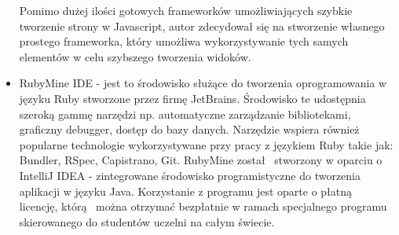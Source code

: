\begin{itemize}
 Pomimo dużej ilości gotowych frameworków umożliwiających szybkie tworzenie strony w Javascript, autor zdecydował się na stworzenie własnego prostego frameworka, który umożliwa wykorzystywanie tych samych elementów w celu szybszego tworzenia widoków.
\item RubyMine IDE - jest to środowisko służące do tworzenia oprogramowania w języku Ruby stworzone przez firmę JetBrains. Środowisko te udostępnia szeroką gammę narzędzi np. automatyczne zarządzanie bibliotekami, graficzny debugger, dostęp do bazy danych. Narzędzie wspiera również popularne technologie wykorzystywane przy pracy z językiem Ruby takie jak: Bundler, RSpec, Capistrano, Git. RubyMine został  stworzony w oparciu o IntelliJ IDEA - zintegrowane środowisko programistyczne do tworzenia aplikacji w języku Java. Korzystanie z programu jest oparte o płatną  licencję, którą  można otrzymać bezpłatnie w ramach specjalnego programu skierowanego do studentów uczelni na całym świecie.
\end{itemize}

